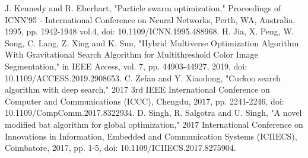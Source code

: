 \documentclass[conference]{IEEEtran}
\theoremstyle{definition}
\begin{document}
\begin{thebibliography}{00}
J. Kennedy and R. Eberhart, "Particle swarm optimization," Proceedings of ICNN'95 - International Conference on Neural Networks, Perth, WA, Australia, 1995, pp. 1942-1948 vol.4, doi: 10.1109/ICNN.1995.488968.
H. Jia, X. Peng, W. Song, C. Lang, Z. Xing and K. Sun, "Hybrid Multiverse Optimization Algorithm With Gravitational Search Algorithm for Multithreshold Color Image Segmentation," in IEEE Access, vol. 7, pp. 44903-44927, 2019, doi: 10.1109/ACCESS.2019.2908653.
C. Zefan and Y. Xiaodong, "Cuckoo search algorithm with deep search," 2017 3rd IEEE International Conference on Computer and Communications (ICCC), Chengdu, 2017, pp. 2241-2246, doi: 10.1109/CompComm.2017.8322934.
D. Singh, R. Salgotra and U. Singh, "A novel modified bat algorithm for global optimization," 2017 International Conference on Innovations in Information, Embedded and Communication Systems (ICIIECS), Coimbatore, 2017, pp. 1-5, doi: 10.1109/ICIIECS.2017.8275904.
\end{thebibliography}
\end{document}
